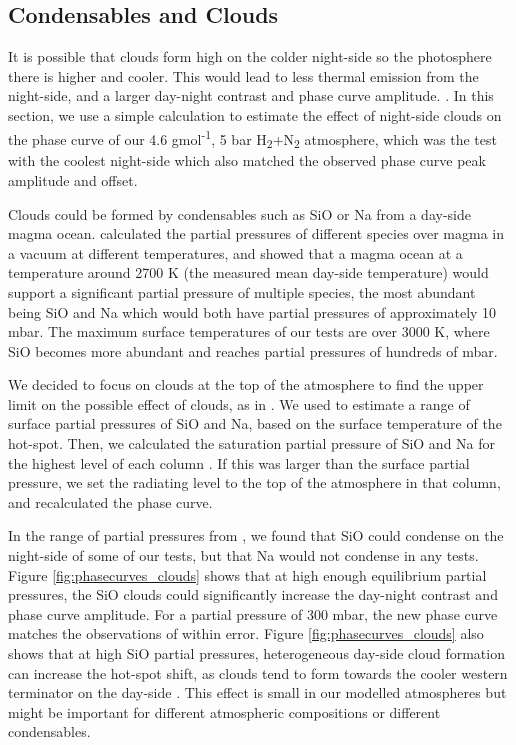 

\subsection{Condensables and Clouds}\label{sec:condensables}

It is possible that clouds form high on the colder night-side so the photosphere there is higher and cooler. This would lead to less thermal emission from the night-side, and a larger day-night contrast and phase curve amplitude. \citep{parmentier2016transitions}. In this section, we use a simple calculation to estimate the effect of night-side clouds on the phase curve of our 4.6 gmol\textsuperscript{-1}, 5 bar H\textsubscript{2}+N\textsubscript{2} atmosphere, which was the test with  the coolest night-side which also matched the observed phase curve peak amplitude and offset.

Clouds could be formed by condensables such as SiO or Na from a day-side magma ocean. \citet{miguel2011compositions} calculated the partial pressures of different species over magma in a vacuum at different temperatures, and showed that a magma ocean at a temperature around 2700 K (the measured mean day-side temperature) would support a significant partial pressure of multiple species, the most abundant being SiO and Na which would both have partial pressures of approximately 10 mbar. The maximum surface temperatures of our tests are over 3000 K, where SiO becomes more abundant and reaches partial pressures of hundreds of mbar.

We decided to focus on clouds at the top of the atmosphere to find the upper limit on the possible effect of clouds, as in \citet{parmentier2016transitions}. We used \citet{miguel2011compositions} to estimate a range of surface partial pressures of SiO and Na, based on the surface temperature of the hot-spot. Then, we calculated the saturation partial pressure of SiO and Na for the highest level of each column \citep{wetzel2013sio}. If this was larger than the surface partial pressure, we set the radiating level to the top of the atmosphere in that column, and recalculated the phase curve.

In the range of partial pressures from \citet{miguel2011compositions}, we found that SiO could condense on the night-side of some of our tests, but that Na would not condense in any tests. Figure \ref{fig:phasecurves_clouds} shows that at high enough equilibrium partial pressures, the SiO clouds could significantly increase the day-night contrast and phase curve amplitude. For a partial pressure of 300 mbar, the new phase curve matches the observations of \citet{demory2016map} within error. Figure \ref{fig:phasecurves_clouds} also shows that at high SiO partial pressures, heterogeneous day-side cloud formation can increase the hot-spot shift, as clouds tend to form towards the cooler western terminator on the day-side \citep{parmentier2016transitions}. This effect is small in our modelled atmospheres but might be important for different atmospheric compositions or different condensables.

